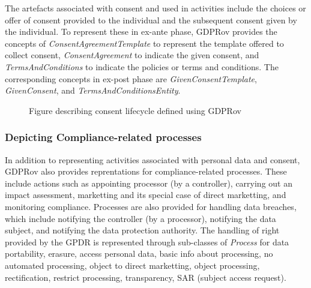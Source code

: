 The artefacts associated with consent and used in activities include the choices or offer of consent provided to the individual and the subsequent consent given by the individual.
To represent these in ex-ante phase, GDPRov provides the concepts of \textit{ConsentAgreementTemplate} to represent the template offered to collect consent, \textit{ConsentAgreement} to indicate the given consent, and \textit{TermsAndConditions} to indicate the policies or terms and conditions.
The corresponding concepts in ex-post phase are \textit{GivenConsentTemplate}, \textit{GivenConsent}, and \textit{TermsAndConditionsEntity}.
\begin{figure}[htbp]
    \centering
    \missingfigure[figcolor=white]{}
    \caption{Figure describing consent lifecycle defined using GDPRov}
    \label{fig:vocabs:gdprov-consent-lifecycle}
\end{figure}

\subsubsection{Depicting Compliance-related processes}
In addition to representing activities associated with personal data and consent, GDPRov also provides reprentations for compliance-related processes.
These include actions such as appointing processor (by a controller), carrying out an impact assessment, marketting and its special case of direct marketting, and monitoring compliance.
Processes are also provided for handling data breaches, which include notifying the controller (by a processor), notifying the data subject, and notifying the data protection authority.
The handling of right provided by the GPDR is represented through sub-classes of \textit{Process} for data portability, erasure, access personal data, basic info about processing, no automated processing, object to direct marketting, object processing, rectification, restrict processing, transparency, SAR (subject access request).




